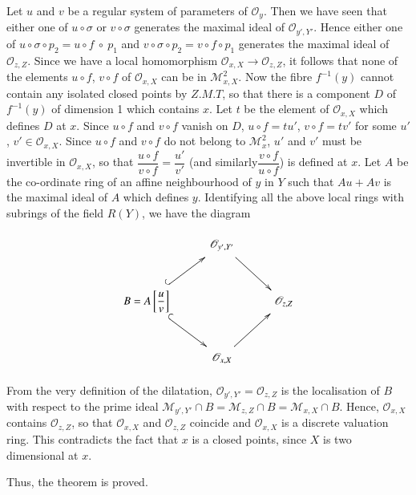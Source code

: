  Let $u$ and $v$ be a regular system of parameters of
 $\mathscr{O}_{y}$. Then we have seen that either one of $u \circ
 \sigma$ or $v \circ \sigma$ generates the maximal ideal of
 $\mathscr{O}_{y', Y'}$. Hence either one of $u \circ \sigma \circ
 p_{2} = u \circ f ~\circ~p_{1}$ and $v	 \circ \sigma \circ p_{2} = v
 \circ f \circ p_{1}$ generates the maximal ideal of
 $\mathscr{O}_{z,Z}$. Since we have a local homomorphism
 $\mathscr{O}_{x,X}\to \mathscr{O}_{z,Z}$, it follows that none of the
 elements $u \circ f$, $v \circ f$ of $\mathscr{O}_{x,X}$ can be in
 $\mathcal{M}^{2}_{x,X}$. Now the fibre $f^{-1}(y)$ cannot contain any
 isolated closed points by $Z.M.T$, so that there is a component $D$
 of $f^{-1}(y)$ of dimension 1 which contains $x$. Let $t$ be the
 element of $\mathscr{O}_{x,X}$ which defines $D$ at $x$. Since $u
 \circ f$ and $v \circ f$ vanish on $D$, $u \circ f = t u'$, $v \circ f =
 t v'$ for some $u'$, $v' \in \mathscr{O}_{x,X}$. Since $u \circ f$ and
 $v \circ f$ do not belong to $\mathcal{M}^{2}_{x}$, $u'$ and $v'$ must
 be invertible in $\mathscr{O}_{x,X}$, so that $\dfrac{u \circ f}{v
   \circ f} = \dfrac{u'}{v'}$ (and similarly\pageoriginale $\dfrac{v \circ f}{u
   \circ f}$) is defined at $x$. Let $A$ be the co-ordinate ring of an
 affine neighbourhood of $y$ in $Y$ such that $Au + Av$ is the maximal
 ideal of $A$ which defines $y$. Identifying all the above local rings
 with subrings of the field $R(Y)$, we have the diagram  

\[
\xymatrix@M=6pt{
 & \mathscr{O}_{y', Y'} \ar[rd]& \\
  B=A \left[\dfrac{u}{v}\right] \ar@{^{(}->}[ru] \ar@{^{(}->}[rd] &  &
  \mathscr{O}_{z, Z}\\ 
  & \mathscr{O}_{x, X} \ar[ru]& 
}
\] 

From the very definition of the dilatation, $\mathscr{O}_{y',Y'} =
\mathscr{O}_{z,Z}$ is the localisation of $B$ with respect to the
prime ideal $\mathcal{M}_{y',Y'} \cap B = \mathcal{M}_{z,Z}\cap B =
\mathcal{M}_{x,X} \cap B$. Hence, $\mathscr{O}_{x,X}$ contains
$\mathscr{O}_{z,Z}$, so that $\mathscr{O}_{x,X}$ and
$\mathscr{O}_{z,Z}$ coincide and $\mathscr{O}_{x,X}$ is a discrete
valuation ring. This contradicts the fact that $x$ is a closed points,
since $X$ is two dimensional at $x$. 
 
Thus, the theorem is proved.      
